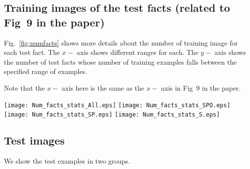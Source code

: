 \documentclass[runningheads]{llncs}
\begin{document}
\subsection{Training images of the test facts (related to Fig~9 in the paper)}


Fig.~\ref{fig:numfacts} shows more details about the number of training image for each test fact. The $x-$ axis shows different ranges for each. The $y-$ axis shows the number of test facts whose number of training examples falls between the specified range of examples.


Note that the $x-$ axis here is the same as the $x-$ axis in Fig~9 in the paper.








\begin{figure*}[b!]
             \vspace{-3mm}
  \texttt{[image: Num\_facts\_stats\_All.eps]}
        \texttt{[image: Num\_facts\_stats\_SPO.eps]}
       \texttt{[image: Num\_facts\_stats\_SP.eps]}
             \texttt{[image: Num\_facts\_stats\_S.eps]}
             \vspace{-3mm}
        \caption{Number of Facts per each ``Number of Images Range''. $x-$axis shows ranges of number of images per fact. $y-$ axis is the number of facts whose number of images fall in the corresponding Range}
        \label{fig:numfacts}
\end{figure*}








\clearpage
\subsection{Test images}




We show the test examples in two groups.
\end{document}
